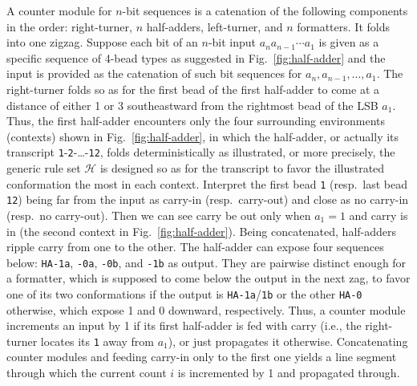 A counter module for $n$-bit sequences is a catenation of the following components in the order: right-turner, $n$ half-adders, left-turner, and $n$ formatters. 
It folds into one zigzag. 
Suppose each bit of an $n$-bit input $a_n a_{n-1} \cdots a_1$ is given as a specific sequence of 4-bead types as suggested in Fig.~\ref{fig:half-adder} and the input is provided as the catenation of such bit sequences for $a_n, a_{n-1}, \ldots, a_1$. 
The right-turner folds so as for the first bead of the first half-adder to come at a distance of either 1 or 3 southeastward from the rightmost bead of the LSB $a_1$. 
Thus, the first half-adder encounters only the four surrounding environments (contexts) shown in Fig.~\ref{fig:half-adder}, in which the half-adder, or actually its transcript {\tt 1}-{\tt 2}-\dots-{\tt 12}, folds deterministically as illustrated, or more precisely, the generic rule set $\mathcal{H}$ is designed so as for the transcript to favor the illustrated conformation the most in each context. 
Interpret the first bead {\tt 1} (resp.~last bead {\tt 12}) being far from the input as carry-in (resp.~carry-out) and close as no carry-in (resp.~no carry-out). 
Then we can see carry be out only when $a_1 = 1$ and carry is in (the second context in Fig.~\ref{fig:half-adder}). 
Being concatenated, half-adders ripple carry from one to the other. 
The half-adder can expose four sequences below: {\tt HA-1a}, {\tt -0a}, {\tt -0b}, and {\tt -1b} as output. 
They are pairwise distinct enough for a formatter, which is supposed to come below the output in the next zag, to favor one of its two conformations if the output is {\tt HA-1a}/{\tt 1b} or the other {\tt HA-0} otherwise, which expose 1 and 0 downward, respectively. 
Thus, a counter module increments an input by 1 if its first half-adder is fed with carry (i.e., the right-turner locates its {\tt 1} away from $a_1$), or just propagates it otherwise. 
Concatenating counter modules and feeding carry-in only to the first one yields a line segment through which the current count $i$ is incremented by 1 and propagated through. 

